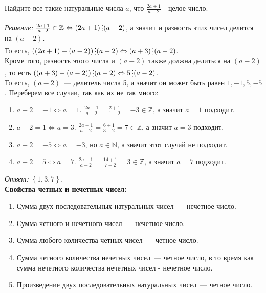 \documentclass[11pt]{article}
\begin{document}
\begin{example}
Найдите все такие натуральные числа $a$, что $\frac{2a + 1}{a - 2}$ - целое число.
\end{example}
\textit{Решение:}
\noindent$\frac{2a + 1}{a - 2} \in \mathbb{Z} \Leftrightarrow (2a + 1) \divisible (a - 2)$, а значит и разность этих чисел делится на $(a - 2)$.\\
То есть, $((2a + 1) - (a - 2)) \divisible (a - 2) \Leftrightarrow (a + 3) \divisible (a - 2)$.\\
 Кроме того, разность этого числа и $(a - 2)$ также должна делиться на  $(a - 2)$, то есть $((a + 3) - (a - 2)) \divisible (a - 2) \Leftrightarrow 5 \divisible (a - 2)$.\\
То есть, $(a - 2)$~--- делитель числа 5, а значит он может быть равен $1, -1, 5, -5$. Переберем все случаи, так как их не так много:

\begin{enumerate}
	\item $a - 2 = -1 \Leftrightarrow a = 1$. $\frac{2 a + 1}{a - 2} = \frac{2 + 1}{1 - 2} = -3 \in \mathbb{Z}$, а значит $a = 1$ подходит.

	\item $a - 2 = 1 \Leftrightarrow a = 3$. $\frac{2 a + 1}{a - 2} = \frac{6 + 1}{3 - 2} = 7 \in \mathbb{Z}$, а значит $a = 3$ подходит.

	\item $a - 2 = -5 \Leftrightarrow a = -3$, но $a \in \mathbb{N}$, а значит этот случай не подходит.

	\item $a - 2 = 5 \Leftrightarrow a = 7$. $\frac{2 a + 1}{a - 2} = \frac{14 + 1}{7 - 2} = 3 \in \mathbb{Z}$, а значит $a = 7$ подходит.
\end{enumerate}

\textit{Ответ:} $\left\{ 1, 3, 7\right\}$.\\


\textbf{Свойства четных и нечетных чисел:}

\begin{enumerate}
	\item Сумма двух последовательных натуральных чисел~--- нечетное число.

	\item Сумма четного и нечетного чисел~--- нечетное число.

	\item Сумма любого количества четных чисел~--- четное число.

	\item Сумма четного количества нечетных чисел~--- четное число, в то время как сумма нечетного количества нечетных чисел - нечетное число.

	\item Произведение двух последовательных натуральных чисел~--- четное число.

\end{enumerate}
\end{document}
